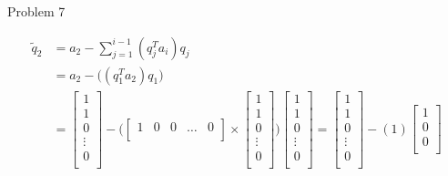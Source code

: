 \begin{problem}{Problem 7}
\begin{Highlight}[Solution]
        \begin{align}
            \tilde{q}_{2} & = a_{2} - \sum_{j = 1}^{i - 1} (q_{j}^{T}a_{i})q_{j} \\
            & = a_{2} - \Bigg( (q_{1}^{T}a_{2})q_{1} \Bigg) \\
            & = 
            \begin{bmatrix}
                1 \\
                1 \\
                0 \\
                \vdots \\
                0 \\
            \end{bmatrix}
            - \Bigg(
            \begin{bmatrix}
                1 & 0 & 0 & \dots & 0 \\
            \end{bmatrix}
            \times
            \begin{bmatrix}
                1 \\
                1 \\
                0 \\
                \vdots \\
                0 \\
            \end{bmatrix}
            \Bigg)
            \begin{bmatrix}
                1 \\
                1 \\
                0 \\
                \vdots \\
                0 \\
            \end{bmatrix} 
            = 
            \begin{bmatrix}
                1 \\
                1 \\
                0 \\
                \vdots \\
                0 \\
            \end{bmatrix}
            - (1)
            \begin{bmatrix}
                1 \\
                0 \\
                0 \\

\end{bmatrix}
\end{align}
\end{Highlight}
\end{problem}
